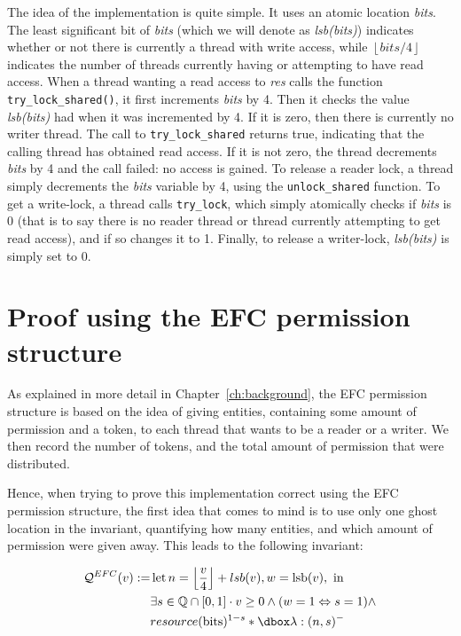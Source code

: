 The idea of the implementation is quite simple. It uses an atomic location \emph{bits}. The least significant bit of \emph{bits} (which we will denote as \emph{lsb(bits)}) indicates whether or not there is currently a thread with write access, while $\left \lfloor{bits / 4} \right \rfloor$ indicates the number of threads currently having or attempting to have read access. When a thread wanting a read access to \emph{res} calls the function \texttt{try\_lock\_shared()}, it first increments \emph{bits} by 4. Then it checks the value \emph{lsb(bits)} had when it was incremented by 4. If it is zero, then there is currently no writer thread. The call to \texttt{try\_lock\_shared} returns true, indicating that the calling thread has obtained read access. If it is not zero, the thread decrements \emph{bits} by 4 and the call failed: no access is gained. To release a reader lock, a thread simply decrements the \emph{bits} variable by 4, using the \texttt{unlock\_shared} function. To get a write-lock, a thread calls \texttt{try\_lock}, which simply atomically checks if \emph{bits} is 0 (that is to say there is no reader thread or thread currently attempting to get read access), and if so changes it to 1. Finally, to release a writer-lock, \emph{lsb(bits)} is simply set to 0.

\section{Proof using the EFC permission structure}
As explained in more detail in Chapter~\ref{ch:background}, the EFC permission structure is based on the idea of giving entities, containing some amount of permission and a token, to each thread that wants to be a reader or a writer. We then record the number of tokens, and the total amount of permission that were distributed.%

Hence, when trying to prove this implementation correct using the EFC permission structure, the first idea that comes to mind is to use only one ghost location in the invariant, quantifying how many entities, and which amount of permission were given away. This leads to the following invariant:

$$\begin{aligned} \mathcal{Q}^{EFC}(v) :=& \operatorname{let} n=\left\lfloor\frac{v}{4}\right\rfloor + lsb(v), w=\operatorname{lsb}(v), \text { in } \\ & \exists s \in \mathbb{Q} \cap[0,1] \cdot v \geq 0 \wedge (w=1 \Leftrightarrow s=1) \wedge \\ & resource(\mathrm{bits})^{1-s} * \ghost{\lambda :(n, s)^{-}}
\end{aligned} $$

